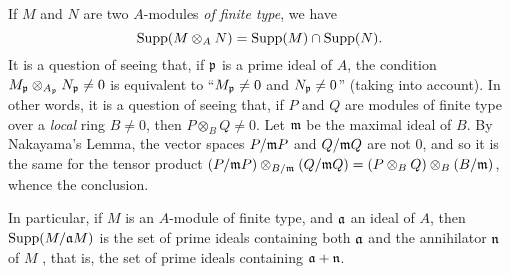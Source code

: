 \begin{env}[1.7.5]
\label{0.1.7.5}
If $M$ and $N$ are two $A$-modules \emph{of finite type}, we have
\[
  {\mathop{\mathrm{Supp}}\nolimits}(M\otimes_A N)={\mathop{\mathrm{Supp}}\nolimits}(M)\cap{\mathop{\mathrm{Supp}}\nolimits}(N).
\]
It is a question of seeing that, if $\mathfrak{p}$ is a prime ideal of $A$, the condition
$M_\mathfrak{p}\otimes_{A_\mathfrak{p}}N_\mathfrak{p}\neq 0$ is equivalent to
``$M_\mathfrak{p}\neq 0$ and $N_\mathfrak{p}\neq 0$'' (taking  into account).
In other words, it is a question of seeing that, if $P$ and $Q$ are
modules of finite type over a \emph{local} ring $B\neq 0$, then
$P\otimes_B Q\neq 0$. Let $\mathfrak{m}$ be the maximal ideal of $B$. By
Nakayama's Lemma, the vector spaces $P/\mathfrak{m}P$ and $Q/\mathfrak{m}Q$
are not $0$, and so it is the same for the tensor product
$(P/\mathfrak{m}P)\otimes_{B/\mathfrak{m}}(Q/\mathfrak{m}Q)
  =(P\otimes_B Q)\otimes_B(B/\mathfrak{m})$, whence the conclusion.

In particular, if $M$ is an $A$-module of finite type, and $\mathfrak{a}$ an ideal
of $A$, then ${\mathop{\mathrm{Supp}}\nolimits}(M/\mathfrak{a}M)$ is the set of prime ideals containing both
$\mathfrak{a}$ and the annihilator $\mathfrak{n}$ of $M$ , that
is, the set of prime ideals containing $\mathfrak{a}+\mathfrak{n}$.
\end{env}
